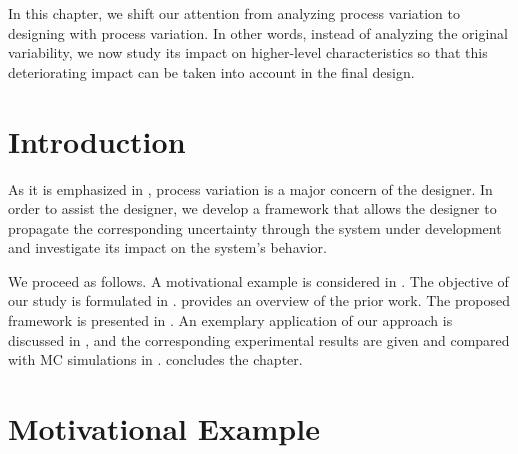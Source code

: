 In this chapter, we shift our attention from analyzing process variation to
designing with process variation. In other words, instead of analyzing the
original variability, we now study its impact on higher-level characteristics so
that this deteriorating impact can be taken into account in the final design.

\section{Introduction}

As it is emphasized in , process variation is a
major concern of the designer. In order to assist the designer, we develop a
framework that allows the designer to propagate the corresponding uncertainty
through the system under development and investigate its impact on the system's
behavior.

We proceed as follows. A motivational example is considered in
. The objective of our study is formulated in
.  provides an overview of the prior
work. The proposed framework is presented in . An
exemplary application of our approach is discussed in , and
the corresponding experimental results are given and compared with \ac{MC}
simulations in .  concludes the
chapter.

\section{Motivational Example}

